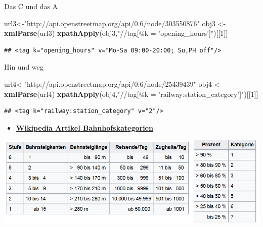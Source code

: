 \documentclass[ignorenonframetext,]{beamer}
\newenvironment{Shaded}{\begin{snugshade}}{\end{snugshade}}
\newcommand{\DecValTok}[1]{\textcolor[rgb]{0.27,0.67,0.26}{#1}}
\newcommand{\KeywordTok}[1]{\textcolor[rgb]{0.26,0.66,0.93}{\textbf{#1}}}
\newcommand{\NormalTok}[1]{\textcolor[rgb]{0.74,0.68,0.62}{#1}}
\newcommand{\StringTok}[1]{\textcolor[rgb]{0.02,0.61,0.04}{#1}}
\providecommand{\tightlist}{%
  \setlength{\itemsep}{0pt}\setlength{\parskip}{0pt}}
\begin{document}
\begin{frame}[fragile]{Das C und das A}
\protect\hypertarget{das-c-und-das-a}{}

\begin{Shaded}
\begin{Highlighting}[]
\NormalTok{url3<-}\StringTok{"http://api.openstreetmap.org/api/0.6/node/303550876"}
\NormalTok{obj3 <-}\StringTok{ }\KeywordTok{xmlParse}\NormalTok{(url3)}
\KeywordTok{xpathApply}\NormalTok{(obj3,}\StringTok{"//tag[@k = 'opening_hours']"}\NormalTok{)[[}\DecValTok{1}\NormalTok{]]}
\end{Highlighting}
\end{Shaded}

\begin{verbatim}
## <tag k="opening_hours" v="Mo-Sa 09:00-20:00; Su,PH off"/>
\end{verbatim}

\end{frame}

\begin{frame}[fragile]{Hin und weg}
\protect\hypertarget{hin-und-weg}{}

\begin{Shaded}
\begin{Highlighting}[]
\NormalTok{url4<-}\StringTok{"http://api.openstreetmap.org/api/0.6/node/25439439"}
\NormalTok{obj4 <-}\StringTok{ }\KeywordTok{xmlParse}\NormalTok{(url4)}
\KeywordTok{xpathApply}\NormalTok{(obj4,}\StringTok{"//tag[@k = 'railway:station_category']"}\NormalTok{)[[}\DecValTok{1}\NormalTok{]]}
\end{Highlighting}
\end{Shaded}

\begin{verbatim}
## <tag k="railway:station_category" v="2"/>
\end{verbatim}

\begin{itemize}[<+->]
\tightlist
\item
  \href{https://de.wikipedia.org/wiki/Bahnhofskategorie}{\textbf{Wikipedia
  Artikel Bahnhofskategorien}}
\end{itemize}

\includegraphics{figure/Bahnhofskategorien.PNG}

\end{frame}
\end{document}
